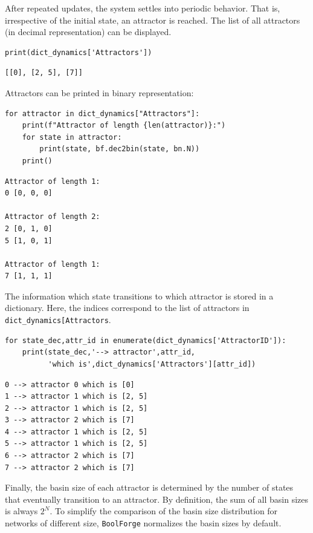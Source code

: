 \documentclass[
]{article}
\begin{document}
After repeated updates, the system settles into periodic behavior. That
is, irrespective of the initial state, an attractor is reached. The list
of all attractors (in decimal representation) can be displayed.

\begin{lstlisting}
print(dict_dynamics['Attractors'])
\end{lstlisting}

\begin{lstlisting}
[[0], [2, 5], [7]]
\end{lstlisting}

Attractors can be printed in binary representation:

\begin{lstlisting}
for attractor in dict_dynamics["Attractors"]:
    print(f"Attractor of length {len(attractor)}:")
    for state in attractor:
        print(state, bf.dec2bin(state, bn.N))
    print()
\end{lstlisting}

\begin{lstlisting}
Attractor of length 1:
0 [0, 0, 0]

Attractor of length 2:
2 [0, 1, 0]
5 [1, 0, 1]

Attractor of length 1:
7 [1, 1, 1]
\end{lstlisting}

The information which state transitions to which attractor is stored in
a dictionary. Here, the indices correspond to the list of attractors in
\texttt{dict\_dynamics{[}\textquotesingle{}Attractors\textquotesingle{}{]}}.

\begin{lstlisting}
for state_dec,attr_id in enumerate(dict_dynamics['AttractorID']):
    print(state_dec,'--> attractor',attr_id,
          'which is',dict_dynamics['Attractors'][attr_id])
\end{lstlisting}

\begin{lstlisting}
0 --> attractor 0 which is [0]
1 --> attractor 1 which is [2, 5]
2 --> attractor 1 which is [2, 5]
3 --> attractor 2 which is [7]
4 --> attractor 1 which is [2, 5]
5 --> attractor 1 which is [2, 5]
6 --> attractor 2 which is [7]
7 --> attractor 2 which is [7]
\end{lstlisting}

Finally, the basin size of each attractor is determined by the number of
states that eventually transition to an attractor. By definition, the
sum of all basin sizes is always \(2^N\). To simplify the comparison of
the basin size distribution for networks of different size,
\texttt{BoolForge} normalizes the basin sizes by default.
\end{document}
